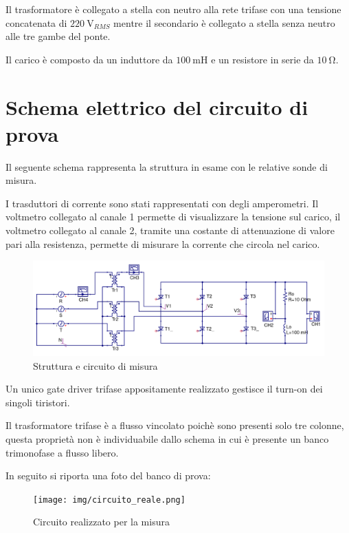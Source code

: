 \documentclass[a4paper,10pt]{article}
\begin{document}
Il trasformatore è collegato a stella con neutro alla rete trifase con una tensione
concatenata di $\SI{220}{\volt_{RMS}}$ mentre il secondario è collegato a stella 
senza neutro alle tre gambe del ponte.

Il carico è composto da un induttore da $\SI{100}{\milli\henry}$ e
un resistore in serie da $\SI{10}{\ohm}$.



\section{Schema elettrico del circuito di prova}
Il seguente schema rappresenta la struttura in esame con le relative sonde
di misura.

I trasduttori di corrente sono stati rappresentati con degli
amperometri. Il voltmetro collegato al canale 1 permette di visualizzare la 
tensione sul carico, il voltmetro collegato al canale 2, tramite una costante di 
attenuazione di valore pari alla resistenza, permette di misurare 
la corrente che circola nel carico.


\begin{figure}[H]
 \centering
 \includegraphics[keepaspectratio=true,width=1\linewidth]{img/circuito_qucs.png}
 \caption{Struttura e circuito di misura}
 \label{fig:circuito}
\end{figure}

Un unico gate driver trifase appositamente realizzato gestisce il turn-on
dei singoli tiristori.

Il trasformatore trifase è a flusso vincolato poichè sono presenti 
solo tre colonne, questa proprietà non è individuabile dallo schema in cui 
è presente un banco trimonofase a flusso libero.

In seguito si riporta una foto del banco di prova:
\begin{figure}[H]
 \centering
 \texttt{[image: img/circuito\_reale.png]}
 \caption{Circuito realizzato per la misura}
 \label{fig:circuito_reale}
\end{figure}
\end{document}
